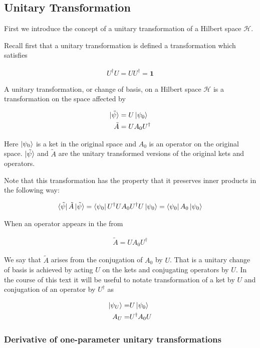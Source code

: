 \documentclass[12pt]{article}
\newcommand{\bv}[1]{\boldsymbol{#1}}
\begin{document}
\subsection{Unitary Transformation}
First we introduce the concept of a unitary transformation of a Hilbert space $\mathcal{H}$.

Recall first that a unitary transformation is defined a transformation which satisfies

\begin{align}
U^{\dag}U = UU^{\dag} = \bv{1}
\end{align}

A unitary transformation, or change of basis, on a Hilbert space $\mathcal{H}$ is a transformation on the space affected by

\begin{align}
\ket{\tilde{\psi}} &= U\ket{\psi_0}\\
\tilde{A} &= UA_0U^{\dag}
\end{align}

Here $\ket{\psi_0}$ is a ket in the original space and $A_0$ is an operator on the original space.
$\ket{\tilde{\psi}}$ and $\tilde{A}$ are the unitary transformed versions of the original kets and operators.

Note that this transformation has the property that it preserves inner products in the following way:

\begin{align}
\bra{\tilde{\psi}}\tilde{A}\ket{\tilde{\psi}} = \bra{\psi_0}U^{\dag}UA_0U^{\dag}U\ket{\psi_0} = \bra{\psi_0}A_0\ket{\psi_0}
\end{align}

When an operator appears in the from

\begin{align}
\tilde{A} = UA_0 U^{\dag}
\end{align}

We say that $\tilde{A}$ arises from the conjugation of $A_0$ by $U$.
That is a unitary change of basis is achieved by acting $U$ on the kets and conjugating operators by $U$.
In the course of this text it will be useful to notate transformation of a ket by $U$ and conjugation of an operator by $U^{\dag}$ as

\begin{align}
\ket{\psi_U} =& U\ket{\psi_0}\\
A_U =& U^{\dag}A_0U
\end{align}

\subsubsection{Derivative of one-parameter unitary transformations}
\end{document}
